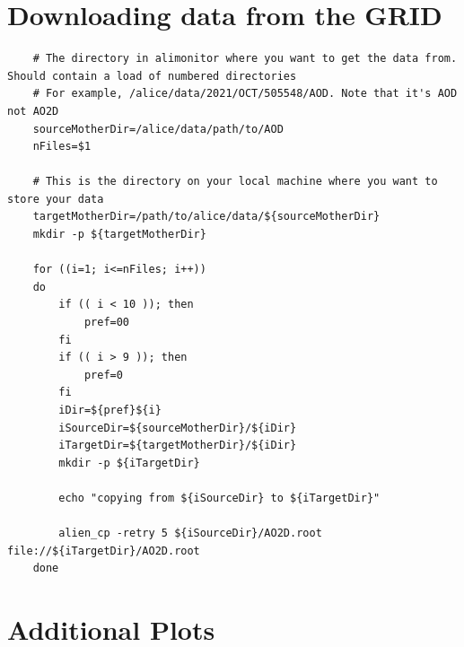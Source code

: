 \section{Downloading data from the GRID}\label{apx:Downloading_Data}
\begin{verbatim}
    # The directory in alimonitor where you want to get the data from. Should contain a load of numbered directories
    # For example, /alice/data/2021/OCT/505548/AOD. Note that it's AOD not AO2D
    sourceMotherDir=/alice/data/path/to/AOD
    nFiles=$1

    # This is the directory on your local machine where you want to store your data
    targetMotherDir=/path/to/alice/data/${sourceMotherDir}
    mkdir -p ${targetMotherDir}

    for ((i=1; i<=nFiles; i++))
    do
        if (( i < 10 )); then
            pref=00
        fi
        if (( i > 9 )); then
            pref=0
        fi
        iDir=${pref}${i}
        iSourceDir=${sourceMotherDir}/${iDir}
        iTargetDir=${targetMotherDir}/${iDir}
        mkdir -p ${iTargetDir}

        echo "copying from ${iSourceDir} to ${iTargetDir}" 
        
        alien_cp -retry 5 ${iSourceDir}/AO2D.root file://${iTargetDir}/AO2D.root
    done
\end{verbatim}

\section{Additional Plots}\label{apx:Additional_Plots}

